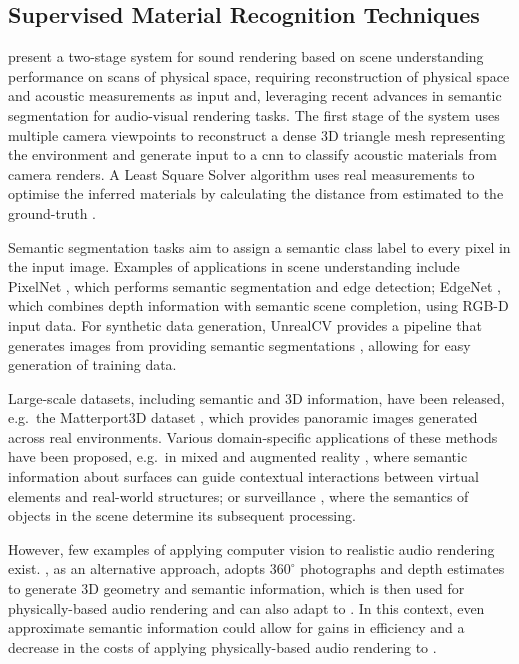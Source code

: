 \subsection{Supervised Material Recognition Techniques}
\cite{schissler2017acoustic} present a two-stage system for sound rendering based on scene understanding performance on scans of physical space, requiring reconstruction of physical space and acoustic measurements as input and, leveraging recent advances in semantic segmentation for audio-visual rendering tasks. The first stage of the system uses multiple camera viewpoints to reconstruct a dense 3D triangle mesh representing the environment and generate input to a \acrshort{cnn} to classify acoustic materials from camera renders. A Least Square Solver algorithm uses real measurements to optimise the inferred materials by calculating the distance from estimated  to the ground-truth .\par
Semantic segmentation tasks aim to assign a semantic class label to every pixel in the input image. Examples of applications in scene understanding include PixelNet \citep{bansal2016pixelnet}, which performs semantic segmentation and edge detection; EdgeNet \citep{dourado2019edgenet}, which combines depth information with semantic scene completion, using RGB-D input data. For synthetic data generation, UnrealCV provides a pipeline that generates images from  providing semantic segmentations \citep{qiu2016unrealcv}, allowing for easy generation of training data.\par
Large-scale datasets, including semantic and 3D information, have been released, e.g.\ the Matterport3D dataset \citep{chang2017matterport3d}, which provides panoramic images generated across real environments. Various domain-specific applications of these methods have been proposed, e.g.\ in mixed and augmented reality \citep{chen2018context}, where semantic information about surfaces can guide contextual interactions between virtual elements and real-world structures; or surveillance \citep{mao2018aic2018}, where the semantics of objects in the scene determine its subsequent processing.\par
However, few examples of applying computer vision to realistic audio rendering exist. \cite{kim2019immersive}, as an alternative approach, adopts $360^{\circ}$ photographs and depth estimates to generate 3D geometry and semantic information, which is then used for physically-based audio rendering and can also adapt to . In this context, even approximate semantic information could allow for gains in efficiency and a decrease in the costs of applying physically-based audio rendering to .\par

